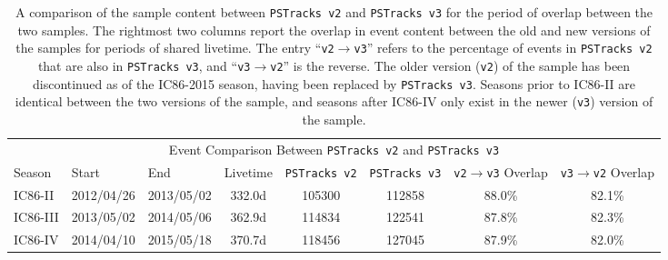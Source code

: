 \documentclass[aps,10pt,prd,twocolumn,floats,letterpaper,showpacs,nofootinbib,bibnotes,notitlepage,superscriptaddress,floatfix]{revtex4-1}
\newcommand{\MA}[1]{{\color{black}#1}}
\begin{document}
\begin{table}[p]
\centering
\begin{ruledtabular}
\begin{tabular}{lllccccc}
\multicolumn{8}{c}{Event Comparison Between \MA{\tt PSTracks~v2} and \MA{\tt PSTracks~v3}} \\[0.1cm]
Season & Start & End & Livetime & \MA{\tt PSTracks v2} & \MA{\tt PSTracks v3} & {\tt v2}$\rightarrow${\tt v3} Overlap & {\tt v3}$\rightarrow${\tt v2} Overlap \\ 
IC86-II & 2012/04/26\footnotemark & 2013/05/02 & 332.0d & 105300 & 112858 & 88.0\% & 82.1\% \\
IC86-III & 2013/05/02 & 2014/05/06 & 362.9d & 114834 & 122541 & 87.8\% & 82.3\% \\
IC86-IV & 2014/04/10\footnotemark & 2015/05/18 & 370.7d & 118456 & 127045 & 87.9\% & 82.0\% \\
\end{tabular}
\end{ruledtabular}
\caption[]{A comparison of the sample content between \MA{\tt PSTracks v2} and \MA{\tt PSTracks v3} for the period of overlap between the two samples. The rightmost two columns report the overlap in event content between the old and new versions of the samples for periods of shared livetime. \MA{The entry ``{\tt v2}$\rightarrow${\tt v3}''} refers to the percentage of events in {\tt PSTracks v2} that are also in \MA{\tt PSTracks v3}, and \MA{``{\tt v3}$\rightarrow${\tt v2}''} is the reverse. The \MA{older} version ({\tt v2}) of the sample has been discontinued as of the IC86-2015 season, having been replaced by \MA{\tt PSTracks v3}. Seasons prior to IC86-II are identical between the two versions of the sample, and seasons after IC86-IV only exist in the \MA{newer} ({\tt v3}) version of the sample.}\label{tab:v2v3evtcontent}
\end{table}
\end{document}
